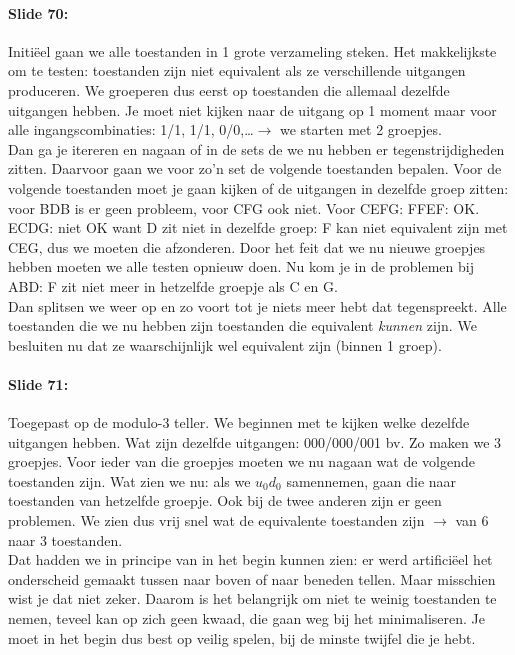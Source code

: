 \documentclass[10pt,a4paper]{book}
\begin{document}
\paragraph{Slide 70:} Initi\"eel gaan we alle toestanden in 1 grote verzameling steken. Het makkelijkste om te testen: toestanden zijn niet equivalent als ze verschillende uitgangen produceren. We groeperen dus eerst op toestanden die allemaal dezelfde uitgangen hebben. Je moet niet kijken naar de uitgang op 1 moment maar voor alle ingangscombinaties: 1/1, 1/1, 0/0,\ldots $\rightarrow$ we starten met 2 groepjes. \\
Dan ga je itereren en nagaan of in de sets de we nu hebben er tegenstrijdigheden zitten. Daarvoor gaan we voor zo'n set de volgende toestanden bepalen.  Voor de volgende toestanden moet je gaan kijken of de uitgangen in dezelfde groep zitten: voor BDB is er geen probleem, voor CFG ook niet. Voor CEFG: FFEF: OK. ECDG: niet OK want D zit niet in dezelfde groep: F kan niet equivalent zijn met CEG, dus we moeten die afzonderen. Door het feit dat we nu nieuwe groepjes hebben moeten we alle testen opnieuw doen. Nu kom je in de problemen bij ABD: F zit niet meer in hetzelfde groepje als C en G.\\
Dan splitsen we weer op en zo voort tot je niets meer hebt dat tegenspreekt. Alle toestanden die we nu hebben zijn toestanden die equivalent \emph{kunnen} zijn. We besluiten nu dat ze waarschijnlijk wel equivalent zijn (binnen 1 groep).

\paragraph{Slide 71:} Toegepast op de modulo-3 teller. We beginnen met te kijken welke dezelfde uitgangen hebben. Wat zijn dezelfde uitgangen: 000/000/001 bv. Zo maken we 3 groepjes. Voor ieder van die groepjes moeten we nu nagaan wat de volgende toestanden zijn. Wat zien we nu: als we $u_0d_0$ samennemen, gaan die naar toestanden van hetzelfde groepje. Ook bij de twee anderen zijn er geen problemen. We zien dus vrij snel wat de equivalente toestanden zijn $\rightarrow$ van 6 naar 3 toestanden.\\
Dat hadden we in principe van in het begin kunnen zien: er werd artifici\"eel het onderscheid gemaakt tussen naar boven of naar beneden tellen. Maar misschien wist je dat niet zeker. Daarom is het belangrijk om niet te weinig toestanden te nemen, teveel kan op zich geen kwaad, die gaan weg bij het minimaliseren. Je moet in het begin dus best op veilig spelen, bij de minste twijfel die je hebt.
\end{document}
